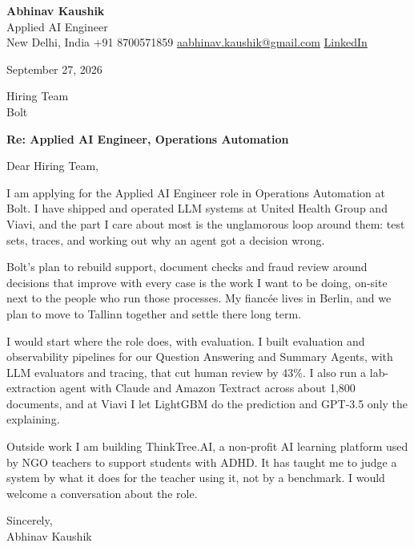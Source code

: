 \documentclass[11pt,a4paper]{article}
\begin{document}
{\Large\bfseries Abhinav Kaushik}\\
Applied AI Engineer\\
New Delhi, India \textbar{} +91 8700571859 \textbar{} \href{mailto:aabhinav.kaushik@gmail.com}{aabhinav.kaushik@gmail.com} \textbar{} \href{https://www.linkedin.com/in/abhinav-kaushik10/}{LinkedIn}  

September 27, 2026

Hiring Team\\
Bolt

\textbf{Re: Applied AI Engineer, Operations Automation}

Dear Hiring Team,

I am applying for the Applied AI Engineer role in Operations Automation at Bolt. I have shipped and operated LLM systems at United Health Group and Viavi, and the part I care about most is the unglamorous loop around them: test sets, traces, and working out why an agent got a decision wrong.

Bolt's plan to rebuild support, document checks and fraud review around decisions that improve with every case is the work I want to be doing, on-site next to the people who run those processes. My fiancée lives in Berlin, and we plan to move to Tallinn together and settle there long term.

I would start where the role does, with evaluation. I built evaluation and observability pipelines for our Question Answering and Summary Agents, with LLM evaluators and tracing, that cut human review by 43\%. I also run a lab-extraction agent with Claude and Amazon Textract across about 1,800 documents, and at Viavi I let LightGBM do the prediction and GPT-3.5 only the explaining.

Outside work I am building ThinkTree.AI, a non-profit AI learning platform used by NGO teachers to support students with ADHD. It has taught me to judge a system by what it does for the teacher using it, not by a benchmark. I would welcome a conversation about the role.

Sincerely,\\[4pt]
Abhinav Kaushik
\end{document}

